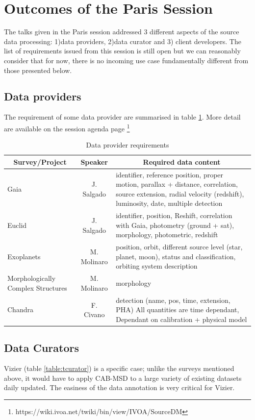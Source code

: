 \documentclass[11pt,a4paper]{ivoa}
\begin{document}
\section{Outcomes of the Paris Session}
The talks given in the Paris session addressed 3 different aspects of the source data processing: 1)data providers, 2)data curator and 3) client developers. 
The list of requirements issued from this session is still open but we can reasonably consider that for now, there is no incoming use case fundamentally different from those presented below.

\subsection{Data providers}
The requirement of some data provider are summarised in table \ref{table:tsurvey}. More detail are available on the session agenda page
\footnote{https://wiki.ivoa.net/twiki/bin/view/IVOA/SourceDM}%

\begin{table}[H]
\begin{tabular}{|p{7em}|c|p{17em}|}
  \hline
  \multicolumn{1}{|c}{\bfseries Survey/Project} & \multicolumn{1}{|c}{\bfseries Speaker} & \multicolumn{1}{|c|}{\bfseries Required data content}
  \\
  \hline
  Gaia & J. Salgado & 
identifier, reference position, proper motion, parallax + distance, correlation, source extension, radial velocity (redshift), luminosity, date, multiple detection
 \\
  \hline
  Euclid & J. Salgado & 
identifier, position, Reshift, correlation with Gaia, photometry (ground + sat), morphology, photometric, redshift
 \\
  \hline
  Exoplanets & M. Molinaro & 
position, orbit, different source level (star, planet, moon), status and classification, orbiting system description
\\
  \hline
Morphologically Complex Structures & M. Molinaro & morphology
\\
  \hline
  Chandra & F. Civano & 
detection (name, pos, time, extension, PHA)
All quantities are time dependant, Dependant on calibration + physical model
\\
  \hline
\end{tabular}
\caption{Data provider requirements}
\label{table:tsurvey}
\end{table}


\subsection{Data Curators}
Vizier (table \ref{table:tcurator}) is a specific case; unlike the surveys mentioned above, it would have to apply CAB-MSD to a large variety of existing datasets daily updated. The easiness of the data annotation is very critical for Vizier.
\end{document}

